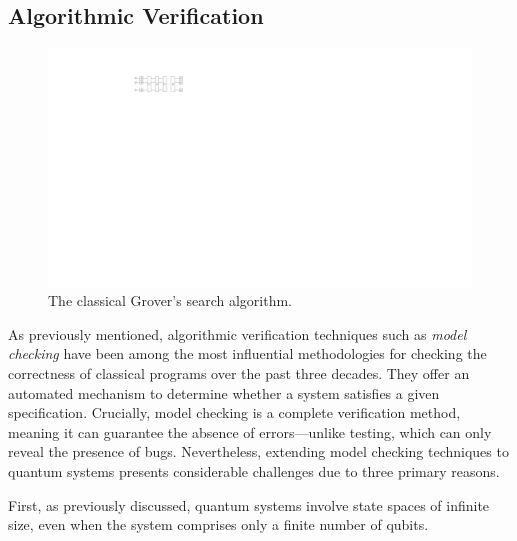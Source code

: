 \subsection{Algorithmic Verification}

\begin{figure}
\center
\includegraphics[scale=0.8]{Figures/Grover/Grover}
\caption{The classical Grover's search algorithm.}
\label{grover:fig}
\end{figure}
%

As previously mentioned, algorithmic verification techniques such as {\it model checking} have been among the most influential methodologies for checking the correctness of classical programs over the past three decades.
%
They offer an automated mechanism to determine whether a system satisfies a given specification.
%
Crucially, model checking is a complete verification method, meaning it can guarantee the absence of errors—unlike testing, which can only reveal the presence of bugs.
%
Nevertheless, extending model checking techniques to quantum systems presents considerable challenges due to three primary reasons.
%

First, as previously discussed, quantum systems involve state spaces of infinite size, even when the system comprises only a finite number of qubits.
%

